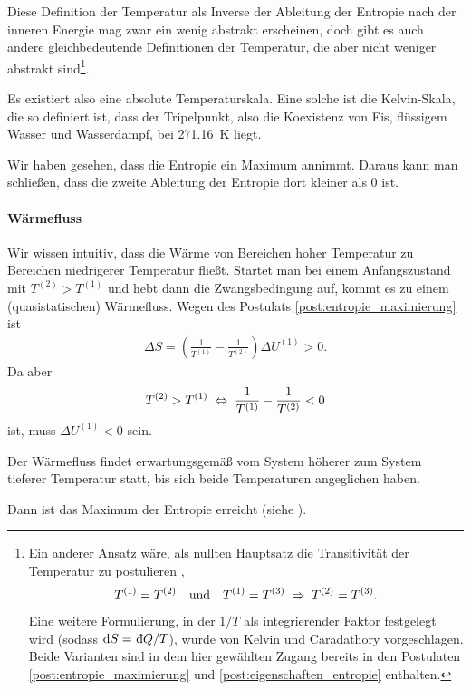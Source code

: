 Diese Definition der Temperatur als Inverse der Ableitung der Entropie nach der inneren Energie mag zwar ein wenig abstrakt erscheinen, doch gibt es auch andere gleichbedeutende Definitionen der Temperatur, die aber nicht weniger abstrakt sind\footnote{Ein anderer Ansatz wäre, als nullten Hauptsatz die Transitivität der Temperatur zu postulieren \cite{lit:nolting1},
    \begin{align*}
        T^{(1)} = T^{(2)} \quad \text{und}\quad T^{(1)} = T^{(3)} \;\Rightarrow\; T^{(2)} = T^{(3)}.
    \end{align*}
    Eine weitere Formulierung, in der $1/T$ als integrierender Faktor festgelegt wird (sodass $\diff S=\udiff Q/T$), wurde von Kelvin und Caradathory vorgeschlagen.
    Beide Varianten sind in dem hier gewählten Zugang bereits in den Postulaten \ref{post:entropie_maximierung} und \ref{post:eigenschaften_entropie} enthalten.
}.

\begin{formal}
    Es existiert also eine absolute Temperaturskala. Eine solche ist die Kelvin-Skala, die so definiert ist, dass der Tripelpunkt, also die Koexistenz von Eis, flüssigem Wasser und Wasserdampf, bei \SI{271,16}{\kelvin} liegt.
\end{formal}

Wir haben gesehen, dass die Entropie ein Maximum annimmt. Daraus kann man schließen, dass die zweite Ableitung der Entropie dort kleiner als $0$ ist.

\paragraph*{Wärmefluss}

Wir wissen intuitiv, dass die Wärme von Bereichen hoher Temperatur zu Bereichen niedrigerer Temperatur fließt. Startet man bei einem Anfangszustand mit $T^{(2)}> T^{(1)}$ und hebt dann die Zwangsbedingung auf, kommt es zu einem (quasistatischen) Wärmefluss.
Wegen des Postulats \ref{post:entropie_maximierung} ist
\begin{align*}
    \Delta S= \left(\frac{1}{T^{(1)}}-\frac{1}{T^{(2)}}\right)\Delta U^{(1)} > 0.
\end{align*}
Da aber
\begin{align*}
    T^{(2)}> T^{(1)} \;\Leftrightarrow\; \frac{1}{T^{(1)}}-\frac{1}{T^{(2)}} < 0
\end{align*}
ist, muss $\Delta U^{(1)} <0$ sein.
\begin{formal}
    Der Wärmefluss findet erwartungsgemäß vom System höherer zum System tieferer Temperatur statt, bis sich beide Temperaturen angeglichen haben.
\end{formal}
Dann ist das Maximum der Entropie erreicht (siehe ).

